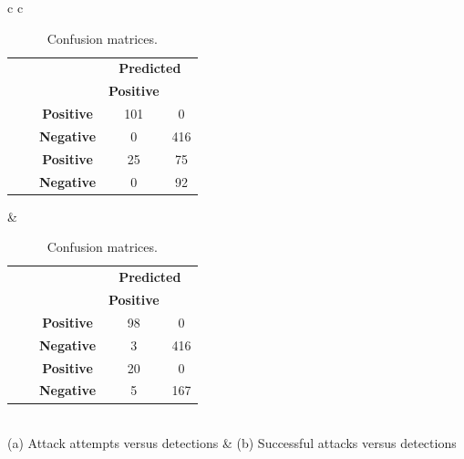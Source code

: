 \begin{table}
\caption{Confusion matrices.}
\label{table:confusion_matrices}
\centering
\begin{tabular}{c c}

\begin{tabular}{c cc|cc|}
\cline{4-5}
& &                   & \multicolumn{2}{|c|}{\cellcolor{LightGray}\textbf{Predicted}}                                  \\
\cline{4-5} 
& &                   & \cellcolor{LightGray}\textbf{Positive} & \cellcolor{LightGray}{\textbf{Negative}}\\
\hline
 \cellcolor{LightGray}& \cellcolor{LightGray} & \cellcolor{LightGray}\textbf{Positive} & 101             & 0                                      \\ 
 \cellcolor{LightGray} & \parbox[t]{2mm}{} & \textbf{Negative} & 0                 & 416                                    \\
&  & \textbf{Positive} & 25             & 75 \\ 
\parbox[t]{2mm}{} &
\parbox[t]{2mm}{}
 & \textbf{Negative} & 0                 & 92                                    \\
\hline
\end{tabular}

& 

\begin{tabular}{c cc|cc|}
\cline{4-5}
& &                   & \multicolumn{2}{|c|}{\cellcolor{LightGray}\textbf{Predicted}}                                  \\
\cline{4-5} 
& &                   & \cellcolor{LightGray}\textbf{Positive} & \cellcolor{LightGray}{\textbf{Negative}}\\
\hline
 \cellcolor{LightGray}& \cellcolor{LightGray} & \cellcolor{LightGray}\textbf{Positive} & 98             & 0                                      \\ 
 \cellcolor{LightGray} & \parbox[t]{2mm}{} & \textbf{Negative} & 3                 & 416                                    \\
&  & \textbf{Positive} & 20             & 0 \\ 
\parbox[t]{2mm}{} &
\parbox[t]{2mm}{}
 & \textbf{Negative} & 5                 & 167                                    \\
\hline
\end{tabular}\\
(a) Attack attempts versus detections & (b) Successful attacks versus detections\\


\end{tabular}
\end{table}
